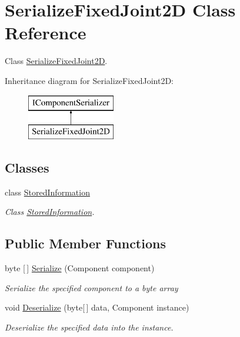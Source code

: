 \hypertarget{class_serialize_fixed_joint2_d}{}\section{Serialize\+Fixed\+Joint2D Class Reference}
\label{class_serialize_fixed_joint2_d}


Class \hyperlink{class_serialize_fixed_joint2_d}{Serialize\+Fixed\+Joint2D}.  


Inheritance diagram for Serialize\+Fixed\+Joint2D\+:\begin{figure}[H]
\begin{center}
\leavevmode
\includegraphics[height=2.000000cm]{class_serialize_fixed_joint2_d}
\end{center}
\end{figure}
\subsection*{Classes}
\begin{DoxyCompactItemize}
\item 
class \hyperlink{class_serialize_fixed_joint2_d_1_1_stored_information}{Stored\+Information}
\begin{DoxyCompactList}\small\item\em Class \hyperlink{class_serialize_fixed_joint2_d_1_1_stored_information}{Stored\+Information}. \end{DoxyCompactList}\end{DoxyCompactItemize}
\subsection*{Public Member Functions}
\begin{DoxyCompactItemize}
\item 
byte \mbox{[}$\,$\mbox{]} \hyperlink{class_serialize_fixed_joint2_d_a9eb05bc525fe5cbf55dd5e917e2f36f2}{Serialize} (Component component)
\begin{DoxyCompactList}\small\item\em Serialize the specified component to a byte array \end{DoxyCompactList}\item 
void \hyperlink{class_serialize_fixed_joint2_d_aa2cc872282e6bb7c209ac406fb0b8335}{Deserialize} (byte\mbox{[}$\,$\mbox{]} data, Component instance)
\begin{DoxyCompactList}\small\item\em Deserialize the specified data into the instance. \end{DoxyCompactList}\end{DoxyCompactItemize}



